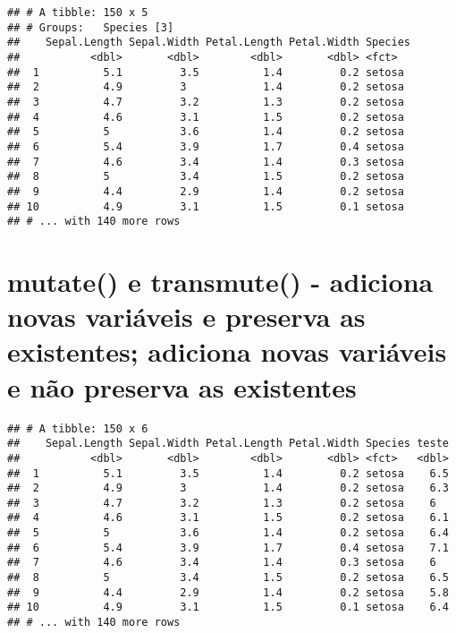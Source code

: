 \documentclass[]{book}
\newenvironment{Shaded}{\begin{snugshade}}{\end{snugshade}}
\newcommand{\DataTypeTok}[1]{\textcolor[rgb]{0.13,0.29,0.53}{#1}}
\newcommand{\KeywordTok}[1]{\textcolor[rgb]{0.13,0.29,0.53}{\textbf{#1}}}
\newcommand{\NormalTok}[1]{#1}
\newcommand{\OperatorTok}[1]{\textcolor[rgb]{0.81,0.36,0.00}{\textbf{#1}}}
\newcommand{\StringTok}[1]{\textcolor[rgb]{0.31,0.60,0.02}{#1}}
\begin{document}
\begin{verbatim}
## # A tibble: 150 x 5
## # Groups:   Species [3]
##    Sepal.Length Sepal.Width Petal.Length Petal.Width Species
##           <dbl>       <dbl>        <dbl>       <dbl> <fct>  
##  1          5.1         3.5          1.4         0.2 setosa 
##  2          4.9         3            1.4         0.2 setosa 
##  3          4.7         3.2          1.3         0.2 setosa 
##  4          4.6         3.1          1.5         0.2 setosa 
##  5          5           3.6          1.4         0.2 setosa 
##  6          5.4         3.9          1.7         0.4 setosa 
##  7          4.6         3.4          1.4         0.3 setosa 
##  8          5           3.4          1.5         0.2 setosa 
##  9          4.4         2.9          1.4         0.2 setosa 
## 10          4.9         3.1          1.5         0.1 setosa 
## # ... with 140 more rows
\end{verbatim}

\hypertarget{mutate-e-transmute---adiciona-novas-variuxe1veis-e-preserva-as-existentes-adiciona-novas-variuxe1veis-e-nuxe3o-preserva-as-existentes}{%
\section{mutate() e transmute() - adiciona novas variáveis e preserva as existentes; adiciona novas variáveis e não preserva as existentes}\label{mutate-e-transmute---adiciona-novas-variuxe1veis-e-preserva-as-existentes-adiciona-novas-variuxe1veis-e-nuxe3o-preserva-as-existentes}}

\begin{Shaded}
\end{Shaded}

\begin{verbatim}
## # A tibble: 150 x 6
##    Sepal.Length Sepal.Width Petal.Length Petal.Width Species teste
##           <dbl>       <dbl>        <dbl>       <dbl> <fct>   <dbl>
##  1          5.1         3.5          1.4         0.2 setosa    6.5
##  2          4.9         3            1.4         0.2 setosa    6.3
##  3          4.7         3.2          1.3         0.2 setosa    6  
##  4          4.6         3.1          1.5         0.2 setosa    6.1
##  5          5           3.6          1.4         0.2 setosa    6.4
##  6          5.4         3.9          1.7         0.4 setosa    7.1
##  7          4.6         3.4          1.4         0.3 setosa    6  
##  8          5           3.4          1.5         0.2 setosa    6.5
##  9          4.4         2.9          1.4         0.2 setosa    5.8
## 10          4.9         3.1          1.5         0.1 setosa    6.4
## # ... with 140 more rows
\end{verbatim}
\end{document}
